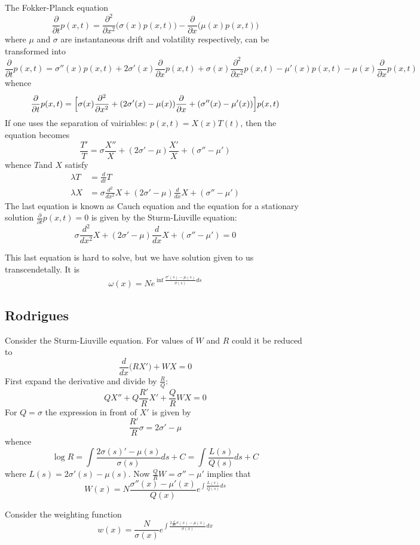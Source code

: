 \documentclass[a4paper]{article}
\begin{document}
The Fokker-Planck equation
\[
\frac{\partial}{\partial t} p(x,t)
= \frac{\partial^2}{\partial x^2} \bigl(\sigma(x) p(x,t) \bigr) 
- \frac{\partial}{\partial x} \bigl(\mu(x) p(x,t) \bigr) 
\]
where $\mu$ and $\sigma$ are instantaneous drift and volatility respectively,
can be transformed into
\[
\frac{\partial}{\partial t} p(x,t)
= \sigma''(x) p(x,t)
	+ 2 \sigma'(x) \frac{\partial}{\partial x} p(x,t)
	+ \sigma(x) \frac{\partial^2}{\partial x^2} p(x,t) 
	- \mu'(x) p(x,t) - \mu(x) \frac{\partial}{\partial x} p(x,t) 
\]
whence
\[
\frac{\partial}{\partial t} p(x,t)
= \Bigl[\sigma(x) \frac{\partial^2}{\partial x^2}
	+ ( 2 \sigma'(x) - \mu(x) ) \frac{\partial}{\partial x}
	+ ( \sigma''(x) - \mu'(x) ) \Bigr] p(x,t)
\]
If one uses the separation of vairiables: $p(x,t) = X(x) T(t)$, then
the equation becomes
\[
\frac{T'}{T} = \sigma \frac{X''}{X} + ( 2 \sigma' - \mu ) \frac{X'}{X} + ( \sigma'' - \mu' )
\]
whence $T$and $X$ satisfy
\begin{align*}
	\lambda T &= \frac{d}{dt} T\\
	\lambda X &= \sigma \frac{d^2}{dx^2} X + (2\sigma'-\mu) \frac{d}{dx} X + (\sigma''-\mu')
\end{align*}
The last equation is known as Cauch equation and the equation for a stationary solution
$\frac{\partial}{\partial t}p(x,t) = 0$ is given by the Sturm-Liuville equation:
\[
\sigma \frac{d^2}{dx^2} X + (2\sigma'-\mu) \frac{d}{dx} X + (\sigma''-\mu') = 0
\]

This last equation is hard to solve, but we have solution given to us transcendetally. It is
\[
\omega(x) = N e^{\inf \frac{\sigma'(s)-\mu(s)}{\sigma(s)} ds}
\]


\subsection*{Rodrigues} %
\label{sub:rodrigues}
Consider the Sturm-Liuville equation. For values of $W$ and $R$ could it be reduced to
\[\frac{d}{dx} \bigl(R X'\bigr) + W X = 0\]
First expand the derivative and divide by $\frac{R}{Q}$:
\[QX'' + Q\frac{R'}{R}X' + \frac{Q}{R} W X = 0\]
For $Q = \sigma$ the expression in front of $X'$ is given by
\[\frac{R'}{R} \sigma = 2\sigma'-\mu\]
whence
\[
\log R
= \int \frac{2\sigma(s)'-\mu(s)}{\sigma(s)} ds + C
= \int \frac{L(s)}{Q(s)} ds + C\]
where $L(s) = 2 \sigma'(s) - \mu(s)$. Now $\frac{Q}{R} W = \sigma''-\mu'$ implies
that
\[W(x) = N \frac{\sigma''(x)-\mu'(x)}{Q(x)} e^{\int \frac{L(s)}{Q(s)} ds} \]

Consider the weighting function
\[w(x) = \frac{N}{\sigma(x)} e^{\int \frac{2\frac{d}{dx}\sigma(x) - \mu(x)}{\sigma(x)}dx}\]




\end{document}
